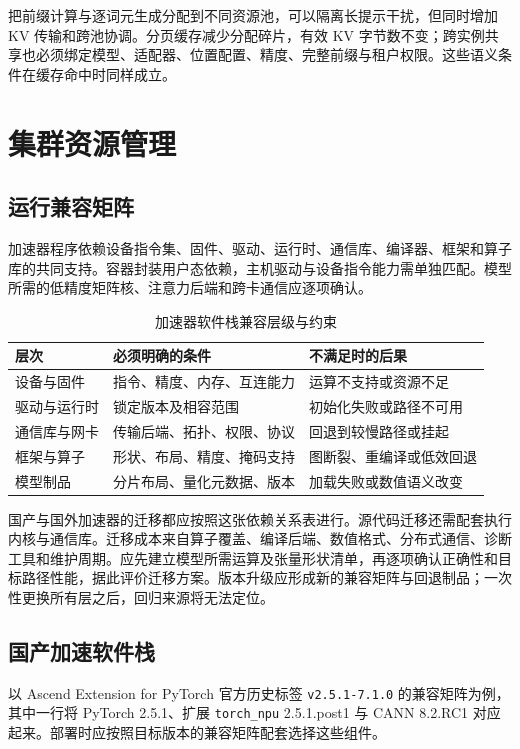 \documentclass[../textbook.tex]{subfiles}
\begin{document}
把前缀计算与逐词元生成分配到不同资源池，可以隔离长提示干扰，但同时增加 KV 传输和跨池协调。分页缓存减少分配碎片，有效 KV 字节数不变；跨实例共享也必须绑定模型、适配器、位置配置、精度、完整前缀与租户权限。这些语义条件在缓存命中时同样成立。

\section{集群资源管理}

\subsection{运行兼容矩阵}
加速器程序依赖设备指令集、固件、驱动、运行时、通信库、编译器、框架和算子库的共同支持。容器封装用户态依赖，主机驱动与设备指令能力需单独匹配。模型所需的低精度矩阵核、注意力后端和跨卡通信应逐项确认。

\begin{table}[htbp]
\centering
\caption{加速器软件栈兼容层级与约束}\label{tab:infra-compat-matrix}
\begin{tabularx}{\linewidth}{@{}lXX@{}}
\toprule
层次 & 必须明确的条件 & 不满足时的后果\\
\midrule
设备与固件 & 指令、精度、内存、互连能力 & 运算不支持或资源不足\\
驱动与运行时 & 锁定版本及相容范围 & 初始化失败或路径不可用\\
通信库与网卡 & 传输后端、拓扑、权限、协议 & 回退到较慢路径或挂起\\
框架与算子 & 形状、布局、精度、掩码支持 & 图断裂、重编译或低效回退\\
模型制品 & 分片布局、量化元数据、版本 & 加载失败或数值语义改变\\
\bottomrule
\end{tabularx}
\end{table}

国产与国外加速器的迁移都应按照这张依赖关系表进行。源代码迁移还需配套执行内核与通信库。迁移成本来自算子覆盖、编译后端、数值格式、分布式通信、诊断工具和维护周期。应先建立模型所需运算及张量形状清单，再逐项确认正确性和目标路径性能，据此评价迁移方案。版本升级应形成新的兼容矩阵与回退制品；一次性更换所有层之后，回归来源将无法定位。

\subsection{国产加速软件栈}
\label{sec:infra-ascend-stack}
以 Ascend Extension for PyTorch 官方历史标签 \texttt{v2.5.1-7.1.0} 的兼容矩阵为例，其中一行将 PyTorch 2.5.1、扩展 \texttt{torch\_npu} 2.5.1.post1 与 CANN 8.2.RC1 对应起来\autocite{ascend2025torchcompat}。部署时应按照目标版本的兼容矩阵配套选择这些组件。
\end{document}
